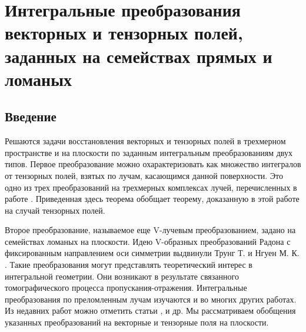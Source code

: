 % 
\chapter{Интегральные преобразования векторных и тензорных полей, заданных на семействах прямых и ломаных}

%
%
%
%


\section{Введение}
Решаются задачи восстановления векторных и тензорных полей в трехмерном пространстве и на плоскости по заданным интегральным преобразованиям двух типов. Первое преобразование можно охарактеризовать как множество интегралов от тензорных полей, взятых по лучам, касающимся данной поверхности. Это одно из трех преобразований на трехмерных комплексах лучей, перечисленных в работе \cite{Medzhidov}. Приведенная здесь теорема обобщает теорему, доказанную в этой работе на случай тензорных полей.

Второе преобразование, называемое еще V-лучевым преобразованием, задано на семействах ломаных на плоскости. Идею V-образных преобразований Радона с фиксированным направлением оси симметрии выдвинули Трунг Т. и Нгуен М. К. \cite{Truong}. Такие преобразования могут представлять теоретический интерес в интегральной геометрии. Они возникают в результате связанного томографического процесса пропускания-отражения. Интегральные преобразования по преломленным лучам изучаются и во многих других работах. Из недавних работ можно отметить статьи \cite{Sharafutdinov}, \cite{Ambartsoumian}  и др.
Мы рассматриваем обобщения указанных преобразований на векторные и тензорные поля на плоскости.
